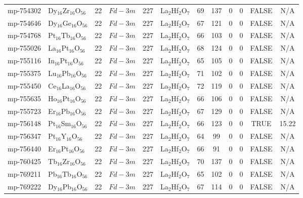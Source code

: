 {\begin{longtable}{llcccccccccc}
    mp-754302 & Dy$_{16}$Zr$_{16}$O$_{56}$ & 22    & $Fd-3m$ & 227   & La$_{2}$Hf$_{2}$O$_{7}$ & 69    & 137   & 0     & 0     & FALSE & N/A \\
    mp-754646 & Dy$_{16}$Ge$_{16}$O$_{56}$ & 22    & $Fd-3m$ & 227   & La$_{2}$Hf$_{2}$O$_{7}$ & 67    & 121   & 0     & 0     & FALSE & N/A \\
    mp-754768 & Pt$_{16}$Tb$_{16}$O$_{56}$ & 22    & $Fd-3m$ & 227   & La$_{2}$Hf$_{2}$O$_{7}$ & 66    & 103   & 0     & 0     & FALSE & N/A \\
    mp-755026 & La$_{16}$Pt$_{16}$O$_{56}$ & 22    & $Fd-3m$ & 227   & La$_{2}$Hf$_{2}$O$_{7}$ & 68    & 124   & 0     & 0     & FALSE & N/A \\
    mp-755116 & In$_{16}$Pt$_{16}$O$_{56}$ & 22    & $Fd-3m$ & 227   & La$_{2}$Hf$_{2}$O$_{7}$ & 65    & 105   & 0     & 0     & FALSE & N/A \\
    mp-755375 & Lu$_{16}$Pb$_{16}$O$_{56}$ & 22    & $Fd-3m$ & 227   & La$_{2}$Hf$_{2}$O$_{7}$ & 71    & 102   & 0     & 0     & FALSE & N/A \\
    mp-755450 & Ce$_{16}$La$_{16}$O$_{56}$ & 22    & $Fd-3m$ & 227   & La$_{2}$Hf$_{2}$O$_{7}$ & 72    & 119   & 0     & 0     & FALSE & N/A \\
    mp-755635 & Ho$_{16}$Pt$_{16}$O$_{56}$ & 22    & $Fd-3m$ & 227   & La$_{2}$Hf$_{2}$O$_{7}$ & 66    & 106   & 0     & 0     & FALSE & N/A \\
    mp-755723 & Er$_{16}$Pb$_{16}$O$_{56}$ & 22    & $Fd-3m$ & 227   & La$_{2}$Hf$_{2}$O$_{7}$ & 67    & 129   & 0     & 0     & FALSE & N/A \\
    mp-756148 & Pt$_{16}$Sm$_{16}$O$_{56}$ & 22    & $Fd-3m$ & 227   & La$_{2}$Hf$_{2}$O$_{7}$ & 66    & 123   & 0     & 0     & TRUE  & 15.22  \\
    mp-756347 & Pt$_{16}$Y$_{16}$O$_{56}$ & 22    & $Fd-3m$ & 227   & La$_{2}$Hf$_{2}$O$_{7}$ & 64    & 99    & 0     & 0     & FALSE & N/A \\
    mp-756440 & Er$_{16}$Pt$_{16}$O$_{56}$ & 22    & $Fd-3m$ & 227   & La$_{2}$Hf$_{2}$O$_{7}$ & 66    & 91    & 0     & 0     & FALSE & N/A \\
    mp-760425 & Tb$_{16}$Zr$_{16}$O$_{56}$ & 22    & $Fd-3m$ & 227   & La$_{2}$Hf$_{2}$O$_{7}$ & 70    & 137   & 0     & 0     & FALSE & N/A \\
    mp-769211 & Pb$_{16}$Tb$_{16}$O$_{56}$ & 22    & $Fd-3m$ & 227   & La$_{2}$Hf$_{2}$O$_{7}$ & 65    & 102   & 0     & 0     & FALSE & N/A \\
    mp-769222 & Dy$_{16}$Pb$_{16}$O$_{56}$ & 22    & $Fd-3m$ & 227   & La$_{2}$Hf$_{2}$O$_{7}$ & 67    & 114   & 0     & 0     & FALSE & N/A \\

\end{longtable}}
